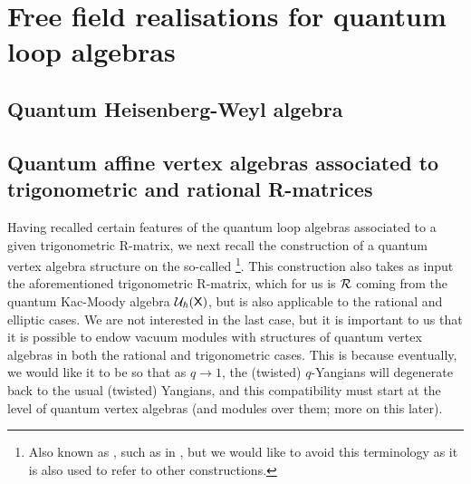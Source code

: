 \section{Free field realisations for quantum loop algebras}
    \subsection{Quantum Heisenberg-Weyl algebra}

    \subsection{Quantum affine vertex algebras associated to trigonometric and rational R-matrices}
        Having recalled certain features of the quantum loop algebras associated to a given trigonometric R-matrix, we next recall the construction of a quantum vertex algebra structure on the so-called \footnote{Also known as , such as in \cite{etingof_kazhdan_quantisation_5}, but we would like to avoid this terminology as it is also used to refer to other constructions.}. This construction also takes as input the aforementioned trigonometric R-matrix, which for us is $\mathcal{R}$ coming from the quantum Kac-Moody algebra $\mathcal{U}_{\hbar}(\mathsf{X})$, but is also applicable to the rational and elliptic cases. We are not interested in the last case, but it is important to us that it is possible to endow vacuum modules with structures of quantum vertex algebras in both the rational and trigonometric cases. This is because eventually, we would like it to be so that as $q \to 1$, the (twisted) $q$-Yangians will degenerate back to the usual (twisted) Yangians, and this compatibility must start at the level of quantum vertex algebras (and modules over them; more on this later).

